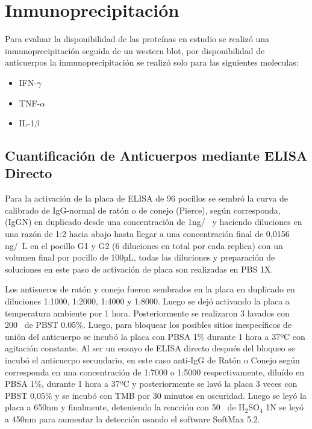 \documentclass[12pt,a4paper,oneside]{scrbook}
\newcommand{\subindice}[1]{$_{\text{#1}}$}
\begin{document}
\section{Inmunoprecipitación}

Para evaluar la disponibilidad de las proteínas en estudio se realizó
una inmunoprecipitación seguida de un western blot, por disponibilidad
de anticuerpos la inmunoprecipitación se realizó solo para las
siguientes moleculas:

\begin{itemize}
\itemsep1pt\parskip0pt
\item
  IFN-$\gamma$
\item
  TNF-$\alpha$
\item
  IL-1$\beta$
\end{itemize}

\subsection{Cuantificación de Anticuerpos mediante ELISA
Directo}\label{cuantificaciuxf3n-de-anticuerpos-mediante-elisa-directo}

Para la activación de la placa de ELISA de 96 pocillos se sembró la
curva de calibrado de IgG-normal de ratón o de conejo (Pierce), según
corresponda, (IgGN) en duplicado desde una concentración de
1ng/\si{\micro\litro} y haciendo diluciones en una razón de 1:2 hacia
abajo hasta llegar a una concentración final de 0,0156
ng/\si{\micro\litro}L en el pocillo G1 y G2 (6 diluciones en total por
cada replica) con un volumen final por pocillo de 100µL, todas las
diluciones y preparación de soluciones en este paso de activación de
placa son realizadas en PBS 1X.

Los antisueros de ratón y conejo fueron sembrados en la placa en
duplicado en diluciones 1:1000, 1:2000, 1:4000 y 1:8000. Luego se dejó
activando la placa a temperatura ambiente por 1 hora. Posteriormente se
realizaron 3 lavados con 200\si{\micro\litro} de PBST 0.05\%. Luego,
para bloquear los posibles sitios inespecíficos de unión del anticuerpo
se incubó la placa con PBSA 1\% durante 1 hora a 37ºC con agitación
constante. Al ser un ensayo de ELISA directo después del bloqueo se
incubó el anticuerpo secundario, en este caso anti-IgG de Ratón o Conejo
según corresponda en una concentración de 1:7000 o 1:5000
respectivamente, diluído en PBSA 1\%, durante 1 hora a 37ºC y
posteriormente se lavó la placa 3 veces con PBST 0,05\% y se incubó con
TMB por 30 minutos en oscuridad. Luego se leyó la placa a 650nm y
finalmente, deteniendo la reacción con 50\si{\micro\litro} de
H\subindice{2}SO\subindice{4} 1N se leyó a 450nm para aumentar la
detección usando el software SoftMax 5.2.
\end{document}

